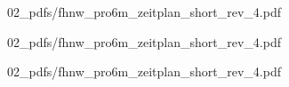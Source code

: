 \documentclass[a4paper,10pt]{scrartcl}
\begin{document}
\begin{landscape}

{02_pdfs/fhnw_pro6m_zeitplan_short_rev_4.pdf}


{02_pdfs/fhnw_pro6m_zeitplan_short_rev_4.pdf}

\end{landscape}

\newpage

{02_pdfs/fhnw_pro6m_zeitplan_short_rev_4.pdf}

\newpage
\end{document}
